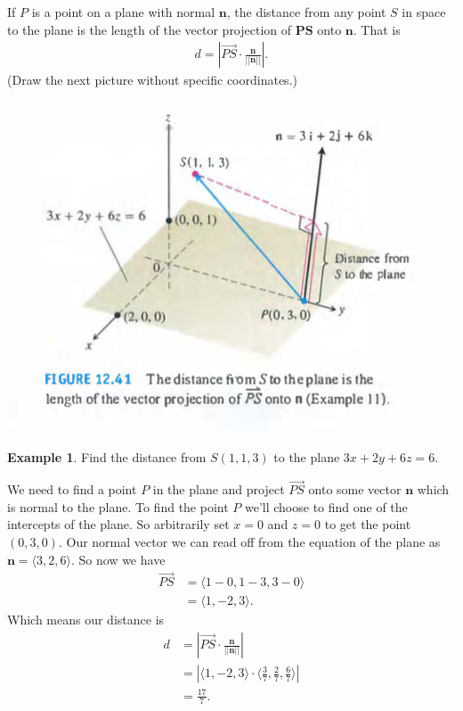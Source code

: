 \documentclass[12pt, letter]{article}
\theoremstyle{plain}
\numberwithin{theorem}{section}
\theoremstyle{definition}
\newtheorem{example}[theorem]{Example}
\begin{document}
\bigskip

\hrulefill

\bigskip

If $P$ is a point on a plane with normal $\bm{n}$, the distance from any point $S$ in space to the plane is the length of the vector projection of $\bm{PS}$ onto $\bm{n}$. That is
\begin{align*}
d = \left| \vec{PS} \cdot \frac{\bm{n}}{||\bm{n}||} \right|.
\end{align*}
(Draw the next picture without specific coordinates.)

\bigskip

\begin{center}
\includegraphics[scale=0.7]{m1_f20}
\end{center}

\bigskip

\hrulefill

\bigskip

\begin{example}
Find the distance from $S(1,1,3)$ to the plane $3x+2y+6z=6$.

\smallskip

We need to find a point $P$ in the plane and project $\vec{PS}$ onto some vector $\bm{n}$ which is normal to the plane. To find the point $P$ we'll choose to find one of the intercepts of the plane. So arbitrarily set $x=0$ and $z=0$ to get the point $(0,3,0)$. Our normal vector we can read off from the equation of the plane as $\bm{n} = \langle 3, 2, 6 \rangle$. So now we have
\begin{align*}
\vec{PS} &= \langle 1-0, 1-3, 3-0 \rangle\\
&= \langle 1, -2, 3 \rangle.
\end{align*}
Which means our distance is
\begin{align*}
d &= \left| \vec{PS} \cdot \frac{\bm{n}}{||\bm{n}||} \right|\\
&= \left| \langle 1, -2, 3 \rangle \cdot \bigg\langle \frac{3}{7}, \frac{2}{7}, \frac{6}{7} \bigg\rangle \right|\\
&= \frac{17}{7}.
\end{align*}
\end{example}
\end{document}

